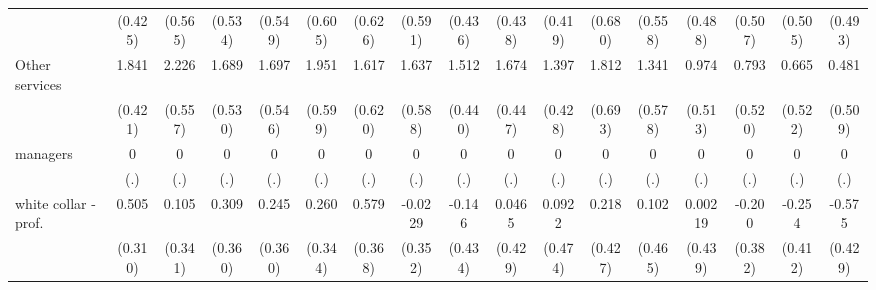 {\begin{tabular}{l*{16}{c}}
                    &     (0.425)         &     (0.565)         &     (0.534)         &     (0.549)         &     (0.605)         &     (0.626)         &     (0.591)         &     (0.436)         &     (0.438)         &     (0.419)         &     (0.680)         &     (0.558)         &     (0.488)         &     (0.507)         &     (0.505)         &     (0.493)         \\
[1em]
Other services      &       1.841\sym{***}&       2.226\sym{***}&       1.689\sym{**} &       1.697\sym{**} &       1.951\sym{**} &       1.617\sym{**} &       1.637\sym{**} &       1.512\sym{***}&       1.674\sym{***}&       1.397\sym{**} &       1.812\sym{**} &       1.341\sym{*}  &       0.974         &       0.793         &       0.665         &       0.481         \\
                    &     (0.421)         &     (0.557)         &     (0.530)         &     (0.546)         &     (0.599)         &     (0.620)         &     (0.588)         &     (0.440)         &     (0.447)         &     (0.428)         &     (0.693)         &     (0.578)         &     (0.513)         &     (0.520)         &     (0.522)         &     (0.509)         \\
[1em]
managers            &           0         &           0         &           0         &           0         &           0         &           0         &           0         &           0         &           0         &           0         &           0         &           0         &           0         &           0         &           0         &           0         \\
                    &         (.)         &         (.)         &         (.)         &         (.)         &         (.)         &         (.)         &         (.)         &         (.)         &         (.)         &         (.)         &         (.)         &         (.)         &         (.)         &         (.)         &         (.)         &         (.)         \\
[1em]
white collar - prof.&       0.505         &       0.105         &       0.309         &       0.245         &       0.260         &       0.579         &     -0.0229         &      -0.146         &      0.0465         &      0.0922         &       0.218         &       0.102         &     0.00219         &      -0.200         &      -0.254         &      -0.575         \\
                    &     (0.310)         &     (0.341)         &     (0.360)         &     (0.360)         &     (0.344)         &     (0.368)         &     (0.352)         &     (0.434)         &     (0.429)         &     (0.474)         &     (0.427)         &     (0.465)         &     (0.439)         &     (0.382)         &     (0.412)         &     (0.429)         \\

\end{tabular}}
